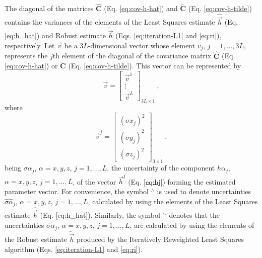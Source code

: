 \documentclass[journal abbreviation, npg]{copernicus}
\begin{document}
The diagonal of the matrices $\hat{\mathbf{C}}$ (Eq. \ref{eq:cov-h-hat}) and $\tilde{\mathbf{C}}$ (Eq. \ref{eq:cov-h-tilde}) contains the variances of the elements of the Least Squares estimate $\hat{\vec{h}}$ (Eq. \ref{eq:h_hat}) and Robust estimate $\tilde{\vec{h}}$ (Eqs. \ref{eq:iteration-L1} and \ref{eq:ri}), respectively. Let $\vec{v}$ be a $3L$-dimensional vector whose element $v_{j}$, $j = 1, ..., 3L$, represents the $j$th element of the diagonal of the covariance matrix $\hat{\mathbf{C}}$ (Eq. \ref{eq:cov-h-hat}) or $\tilde{\mathbf{C}}$ (Eq. \ref{eq:cov-h-tilde}). This vector can be represented by
\begin{equation}
\vec{v} = 
\left[
\begin{array}{cc}
\vec{v}^{1} \\
\vdots \\
\vec{v}^{L}
\end{array}
\right]_{3L \times 1} \: ,
\label{eq:v}
\end{equation}
where
\begin{equation}
\vec{v}^{j} = 
\left[
\begin{array}{cc}
\left( \sigma x_{j} \right)^{2} \\
\left( \sigma y_{j} \right)^{2} \\
\left( \sigma z_{j} \right)^{2}
\end{array}
\right]_{3 \times 1} \: ,
\label{eq:vj}
\end{equation}
being ${\sigma \alpha}_{j}$, $\alpha = x, y, z$, $j = 1, ..., L$, the uncertainty of the component ${h \alpha}_{j}$, $\alpha = x, y, z$, $j = 1, ..., L$, of the vector $\vec{h}^{j}$ (Eq. \ref{eq:hj}) forming the estimated parameter vector. For convenience, the symbol $^\wedge$ is used to denote uncertainties $\hat{\sigma \alpha}_{j}$, $\alpha = x, y, z$, $j = 1, ..., L$, calculated by using the elements of the Least Squares estimate $\hat{\vec{h}}$ (Eq. \ref{eq:h_hat}). Similarly, the symbol $^\sim$ denotes that the uncertainties $\tilde{\sigma \alpha}_{j}$, $\alpha = x, y, z$, $j = 1, ..., L$, are calculated by using the elements of the Robust estimate $\tilde{\vec{h}}$ produced by the Iteratively Reweighted Least Squares algorithm (Eqs. \ref{eq:iteration-L1} and \ref{eq:ri}).
\end{document}
